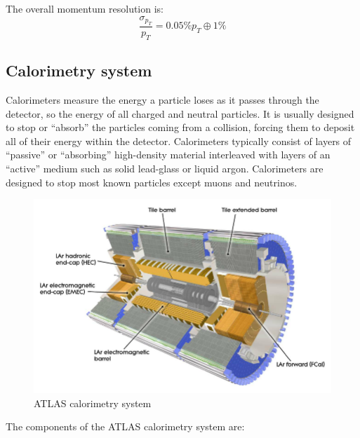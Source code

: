 \documentclass[a4paper, oneside]{book}
\begin{document}
					The overall momentum resolution is:
					$$
					\frac{\sigma_{p_T}}{p_T} = 0.05\% p_T \oplus 1\%
					$$
				\subsection{Calorimetry system}
					\cite{Calo intro}Calorimeters measure the energy a particle loses as it passes through the detector, so the energy of all charged and neutral particles. It is usually designed to stop  or “absorb” the particles coming from a collision, forcing them to deposit all of their energy within the detector. Calorimeters typically consist of layers of “passive” or “absorbing” high-density material interleaved with layers of an “active” medium such as solid lead-glass or liquid argon. Calorimeters are designed to stop most known particles except muons and neutrinos.
					\begin{figure} [H]
						\centering
						\includegraphics[width=.6\textwidth]{tesi_images/calorimeters.png} 
						\caption{ATLAS calorimetry system}
						\label{fig:Calorimetry}
					\end{figure}
					The components of the ATLAS calorimetry system are: \cite{ATLAS TDR} \cite{Calorimetry}
\end{document}
